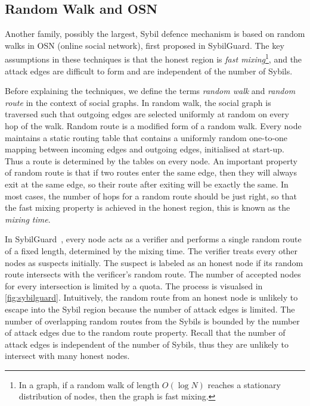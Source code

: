 \subsection{Random Walk and OSN}\label{sec:random-walk}
Another family, possibly the largest, Sybil defence mechanism is based on random
walks in OSN (online social network), first proposed in
SybilGuard\cite{yu2006sybilguard}. The key assumptions in these techniques is
that the honest region is \emph{fast mixing}\footnote{In a graph, if a random
  walk of length $O(\log{N})$ reaches a stationary distribution of nodes, then
  the graph is fast mixing.}, and the attack edges are difficult to form and are
independent of the number of Sybils.


Before explaining the techniques, we define the terms \emph{random walk} and
\emph{random route} in the context of social graphs. In random walk, the social
graph is traversed such that outgoing edges are selected uniformly at random on
every hop of the walk. Random route is a modified form of a random walk. Every
node maintains a static routing table that contains a uniformly random
one-to-one mapping between incoming edges and outgoing edges, initialised at
start-up. Thus a route is determined by the tables on every node. An important
property of random route is that if two routes enter the same edge, then they
will always exit at the same edge, so their route after exiting will be exactly
the same. In most cases, the number of hops for a random route should be just
right, so that the fast mixing property is achieved in the honest region, this
is known as the \emph{mixing time}.

In SybilGuard~\cite{yu2006sybilguard}, every node acts as a verifier and
performs a single random route of a fixed length, determined by the mixing time.
The verifier treats every other nodes as suspects initially. The suspect is
labeled as an honest node if its random route intersects with the verificer's
random route. The number of accepted nodes for every intersection is limited by
a quota. The process is visualsed in \autoref{fig:sybilguard}. Intuitively, the
random route from an honest node is unlikely to escape into the Sybil region
because the number of attack edges is limited. The number of overlapping random
routes from the Sybils is bounded by the number of attack edges due to the
random route property. Recall that the number of attack edges is independent of
the number of Sybils, thus they are unlikely to intersect with many honest
nodes.

